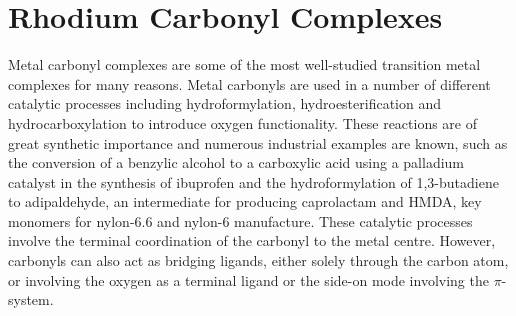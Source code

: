 %

\section{Rhodium Carbonyl Complexes}

Metal carbonyl complexes are some of the most well-studied transition metal complexes for many reasons.  Metal carbonyls are used in a number of different catalytic processes including hydroformylation, hydroesterification and hydrocarboxylation to introduce oxygen functionality.\cite{Leeuwenbook2000, Guiu2006, Bertoux1999}  These reactions are of great synthetic importance and numerous industrial examples are known, such as the conversion of a benzylic alcohol to a carboxylic acid using a palladium catalyst in the synthesis of ibuprofen\cite{Kjonaas2011} and the hydroformylation of 1,3-butadiene to adipaldehyde, an intermediate for producing caprolactam and \gls{HMDA}, key monomers for nylon-6.6 and nylon-6 manufacture.\cite{Franke2012}  These catalytic processes involve the terminal coordination of the carbonyl to the metal centre.  However, carbonyls can also act as bridging ligands, either solely through the carbon atom, or involving the oxygen as a terminal ligand or the side-on  mode involving the $\pi$-system.  

